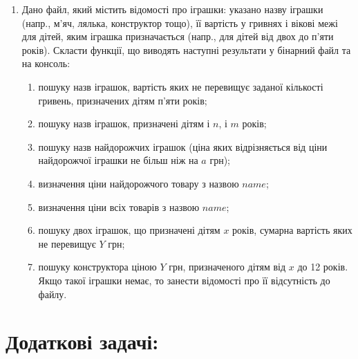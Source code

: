 \documentclass[a5paper,titlepage,openany,twoside,
]
{book_unv}%
\makeatletter
\newcommand{\xslalph}[1]{\expandafter\@xslalph\csname c@#1\endcsname}
\newcommand{\@xslalph}[1]{%
    \ifcase#1\or а\or б\or в\or г\or д\or e\or є\or ж\or з\or i%
    \or й\or к\or л\or м\or н\or о\or п\or р\or с\or т%
    \or у\or ф\or х\or ц\or ч\or ш\or ю\or я\or аа\or бб\or вв%
    \else\@ctrerr\fi%
}
\makeatother
\begin{document}
\begin{enumerate}
\item
  Дано файл, який містить відомості про іграшки: указано назву іграшки
  (напр., м'яч, лялька, конструктор тощо), її вартість у гривнях і
  вікові межі для дітей, яким іграшка призначається (напр., для дітей
  від двох до п'яти років). Скласти функції, що виводять наступні результати 
  у бінарний файл та на консоль:

  \begin{enumerate}[label=\xslalph*)]
\item
пошуку назв іграшок, вартість яких не перевищує заданої кількості гривень,
 призначених дітям п'яти років;
\item
пошуку назв іграшок, призначені дітям і $n$, і $m$ років;
\item
пошуку назв найдорожчих іграшок (ціна яких відрізняється від ціни
найдорожчої іграшки не більш ніж на $a$ грн);
\item визначення ціни найдорожчого товару з назвою $name$;
\item визначення ціни всіх товарів з назвою $name$;
\item пошуку двох іграшок, що призначені дітям $x$ років, сумарна
вартість яких не перевищує $Y$ грн;
\item
пошуку конструктора ціною $Y$ грн, призначеного дітям від $x$ до
12 років. Якщо такої іграшки немає, то занести відомості про її
відсутність до файлу.
  \end{enumerate} 


\end{enumerate}

\section{Додаткові задачі:}
\end{document}
